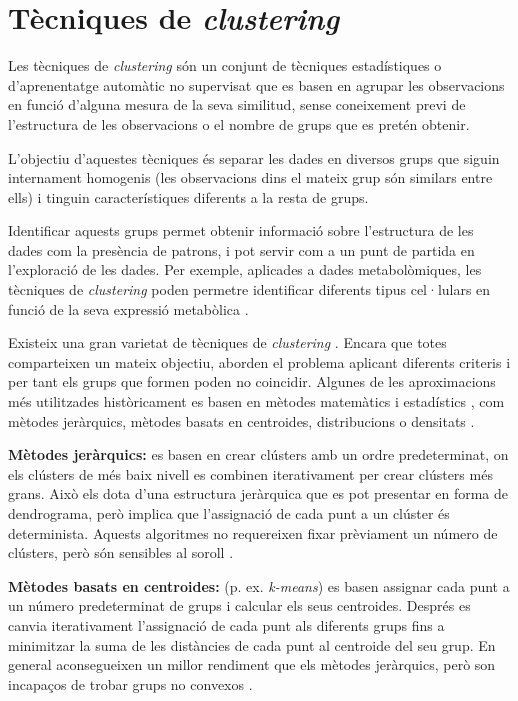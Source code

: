 \documentclass[CAT,BIB]{TFUOC}%
\begin{document}
    \section{Tècniques de \textit{clustering}}
    \label{s:state_cluster}

        Les tècniques de \textit{clustering} són un conjunt de tècniques estadístiques o d'aprenentatge automàtic no supervisat que es basen en agrupar les observacions en funció d'alguna mesura de la seva similitud, sense coneixement previ de l'estructura de les observacions o el nombre de grups que es pretén obtenir.

        L'objectiu d'aquestes tècniques és separar les dades en diversos grups que siguin internament homogenis (les observacions dins el mateix grup són similars entre ells) i tinguin característiques diferents a la resta de grups.

        Identificar aquests grups permet obtenir informació sobre l'estructura de les dades com la presència de patrons, i pot servir com a un punt de partida en l'exploració de les dades. Per exemple, aplicades a dades metabolòmiques, les tècniques de \textit{clustering} poden permetre identificar diferents tipus cel·lulars en funció de la seva expressió metabòlica \citep{Blekherman2011}.

        Existeix una gran varietat de tècniques de \textit{clustering} \citep{Karim2021, Min2018, Blekherman2011, Masood2015}. Encara que totes comparteixen un mateix objectiu, aborden el problema aplicant diferents criteris i per tant els grups que formen poden no coincidir. Algunes de les aproximacions més utilitzades històricament es basen en mètodes matemàtics i estadístics \citep{Masood2015}, com mètodes jeràrquics, mètodes basats en centroides, distribucions o densitats \citep{Karim2021}.

        \textbf{Mètodes jeràrquics:} es basen en crear clústers amb un ordre predeterminat, on els clústers de més baix nivell es combinen iterativament per crear clústers més grans. Això els dota d'una estructura jeràrquica que es pot presentar en forma de dendrograma, però implica que l'assignació de cada punt a un clúster és determinista. Aquests algoritmes no requereixen fixar prèviament un número de clústers, però són sensibles al soroll \citep{Karim2021}.

        \textbf{Mètodes basats en centroides:} (p. ex. \textit{k-means}) es basen assignar cada punt a un número predeterminat de grups i calcular els seus centroides. Després es canvia iterativament l'assignació de cada punt als diferents grups fins a minimitzar la suma de les distàncies de cada punt al centroide del seu grup. En general aconsegueixen un millor rendiment que els mètodes jeràrquics, però son incapaços de trobar grups no convexos \citep{Karim2021}.
\end{document}
